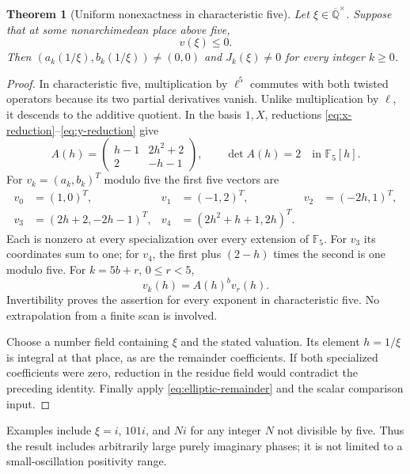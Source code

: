 \documentclass[11pt]{article}
\numberwithin{equation}{section}
\newtheorem{theorem}{Theorem}[section]
\theoremstyle{definition}
\theoremstyle{remark}
\newcommand{\Qbar}{\overline{\mathbb Q}}
\begin{document}
\begin{theorem}[Uniform nonexactness in characteristic five]\label{thm:modfive}
Let $\xi\in\Qbar^\times$. Suppose that at some nonarchimedean place above five,
\begin{equation}\label{eq:valuation-condition}
 v(\xi)\le0.
\end{equation}
Then $(a_k(1/\xi),b_k(1/\xi))\ne(0,0)$ and $J_k(\xi)\ne0$ for every
integer $k\ge0$.
\end{theorem}
\begin{proof}
In characteristic five, multiplication by $\ell^5$ commutes with both
twisted operators because its two partial derivatives vanish. Unlike
multiplication by $\ell$, it descends to the additive quotient. In the basis
$1,X$, reductions \eqref{eq:x-reduction}--\eqref{eq:y-reduction} give
\[
 A(h)=\begin{pmatrix}h-1&2h^2+2\\2&-h-1\end{pmatrix},
 \qquad \det A(h)=2\quad\text{in }\mathbb F_5[h].
\]
For $v_k=(a_k,b_k)^T$ modulo five the first five vectors are
\begin{align*}
 v_0&=(1,0)^T,&v_1&=(-1,2)^T,&v_2&=(-2h,1)^T,\\
 v_3&=(2h+2,-2h-1)^T,&v_4&=(2h^2+h+1,2h)^T.
\end{align*}
Each is nonzero at every specialization over every extension of
$\mathbb F_5$. For $v_3$ its coordinates sum to one; for $v_4$, the first
plus $(2-h)$ times the second is one modulo five. For $k=5b+r$, $0\le r<5$,
\[
 v_k(h)=A(h)^b v_r(h).
\]
Invertibility proves the assertion for every exponent in characteristic
five. No extrapolation from a finite scan is involved.

Choose a number field containing $\xi$ and the stated valuation. Its element
$h=1/\xi$ is integral at that place, as are the remainder coefficients.
If both specialized coefficients were zero, reduction in the residue field
would contradict the preceding identity. Finally apply
\eqref{eq:elliptic-remainder} and the scalar comparison input.
\end{proof}

Examples include $\xi=i$, $101i$, and $Ni$ for any integer $N$ not divisible
by five. Thus the result includes arbitrarily large purely imaginary phases;
it is not limited to a small-oscillation positivity range.
\end{document}
